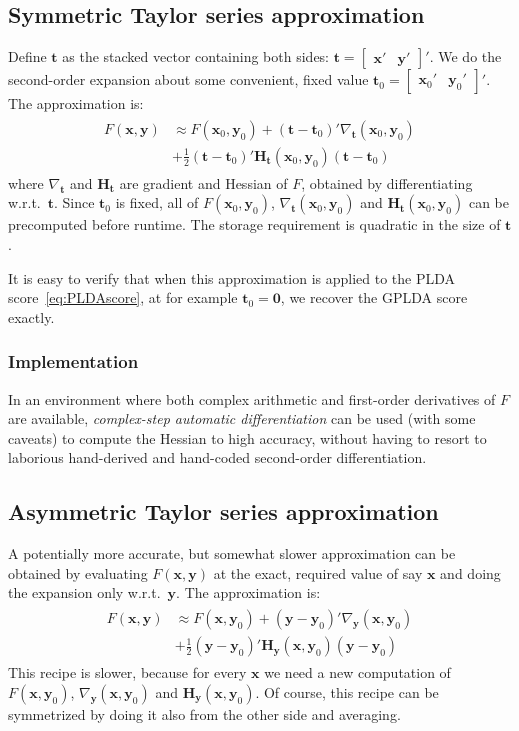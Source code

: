 \documentclass[a4paper,oneside,12pt,english]{report}
\def\Hmat{\mathbf{H}}
\def\yvec{\mathbf{y}}
\def\xvec{\mathbf{x}}
\def\nulvec{\boldsymbol{0}}
\def\bmat#1{\begin{bmatrix}#1\end{bmatrix}}
\begin{document}
\subsection{Symmetric Taylor series approximation}
\def\tvec{\mathbf{t}}
Define $\tvec$ as the stacked vector containing both sides: $\tvec=\bmat{\xvec'&\yvec'}'$. We do the second-order expansion about some convenient, fixed value $\tvec_0=\bmat{\xvec_0'&\yvec_0'}'$. The approximation is:
\begin{align}
\begin{split}
F(\xvec,\yvec) &\approx F(\xvec_0,\yvec_0) + (\tvec-\tvec_0)'\nabla_\tvec(\xvec_0,\yvec_0)\\ 
&+ \frac12(\tvec-\tvec_0)'\Hmat_\tvec(\xvec_0,\yvec_0)(\tvec-\tvec_0)
\end{split}
\end{align} 
where $\nabla_\tvec$ and $\Hmat_\tvec$ are gradient and Hessian of $F$, obtained by differentiating w.r.t.\ $\tvec$. Since $\tvec_0$ is fixed, all of $F(\xvec_0,\yvec_0)$, $\nabla_\tvec(\xvec_0,\yvec_0)$ and $\Hmat_\tvec(\xvec_0,\yvec_0)$ can be precomputed before runtime. The storage requirement is quadratic in the size of $\tvec$.

It is easy to verify that when this approximation is applied to the PLDA score~\eqref{eq:PLDAscore}, at for example $\tvec_0=\nulvec$, we recover the GPLDA score exactly. 

\subsubsection{Implementation}
In an environment where both complex arithmetic and first-order derivatives of $F$ are available, \emph{complex-step automatic differentiation} can be used (with some caveats) to compute the Hessian to high accuracy, without having to resort to laborious hand-derived and hand-coded second-order differentiation. 


\subsection{Asymmetric Taylor series approximation}
A potentially more accurate, but somewhat slower approximation can be obtained by evaluating $F(\xvec,\yvec)$ at the exact, required value of say $\xvec$ and doing the expansion only w.r.t.\ $\yvec$. The approximation is:  
\begin{align}
\begin{split}
F(\xvec,\yvec) &\approx F(\xvec,\yvec_0) + (\yvec-\yvec_0)'\nabla_\yvec(\xvec,\yvec_0)\\
&+ \frac12(\yvec-\yvec_0)'\Hmat_\yvec(\xvec,\yvec_0)(\yvec-\yvec_0)
\end{split}
\end{align} 
This recipe is slower, because for every $\xvec$ we need a new computation of $F(\xvec,\yvec_0)$, $\nabla_\yvec(\xvec,\yvec_0)$ and $\Hmat_\yvec(\xvec,\yvec_0)$. Of course, this recipe can be symmetrized by doing it also from the other side and averaging.
\end{document}
